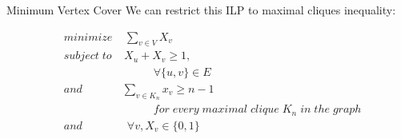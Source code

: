 \documentclass{beamer}
\begin{document}
\begin{frame}{Minimum Vertex Cover}
We can restrict this ILP to maximal cliques inequality:


\begin{align*}
&minimize \; \;\; \; \sum_{v\in V}X_v\\
&subject\; to \;\;\; \; X_u + X_v  \geq 1 ,\\
&\qquad 	\qquad\qquad\qquad	 \forall \{u,v\} \in E\\
&and	\qquad\quad\;\; \sum_{v\in K_n}x_v \geq n - 1\\
& \qquad\qquad \qquad\qquad for\; every\; maximal\; clique\; K_n\; in\; the\; graph\\
&and	\qquad\qquad	 \forall v, X_v\in \{0,1\}
\end{align*}
\end{frame}
\end{document}
